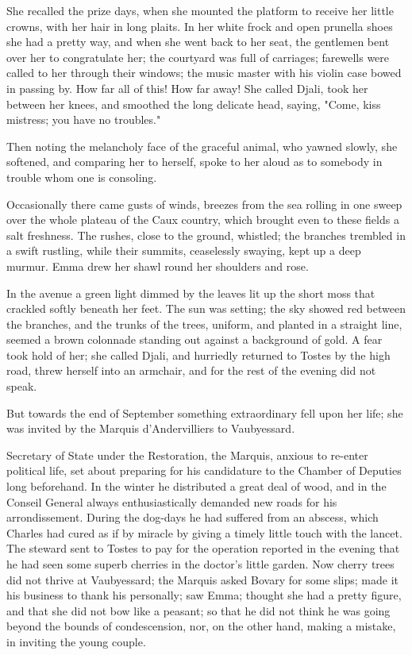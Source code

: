 \documentclass[11pt,twocolumn]{ltugboat}
\begin{document}
She recalled the prize days, when she mounted the platform to receive
her little crowns, with her hair in long plaits. In her white frock and
open prunella shoes she had a pretty way, and when she went back to her
seat, the gentlemen bent over her to congratulate her; the courtyard was
full of carriages; farewells were called to her through their windows;
the music master with his violin case bowed in passing by. How far all
of this! How far away! She called Djali, took her between her knees, and
smoothed the long delicate head, saying, "Come, kiss mistress; you have
no troubles."

Then noting the melancholy face of the graceful animal, who yawned
slowly, she softened, and comparing her to herself, spoke to her aloud
as to somebody in trouble whom one is consoling.

Occasionally there came gusts of winds, breezes from the sea rolling in
one sweep over the whole plateau of the Caux country, which brought
even to these fields a salt freshness. The rushes, close to the ground,
whistled; the branches trembled in a swift rustling, while their
summits, ceaselessly swaying, kept up a deep murmur. Emma drew her shawl
round her shoulders and rose.

In the avenue a green light dimmed by the leaves lit up the short moss
that crackled softly beneath her feet. The sun was setting; the sky
showed red between the branches, and the trunks of the trees, uniform,
and planted in a straight line, seemed a brown colonnade standing out
against a background of gold. A fear took hold of her; she called Djali,
and hurriedly returned to Tostes by the high road, threw herself into an
armchair, and for the rest of the evening did not speak.

But towards the end of September something extraordinary fell upon her
life; she was invited by the Marquis d'Andervilliers to Vaubyessard.

Secretary of State under the Restoration, the Marquis, anxious to
re-enter political life, set about preparing for his candidature to
the Chamber of Deputies long beforehand. In the winter he distributed a
great deal of wood, and in the Conseil General always enthusiastically
demanded new roads for his arrondissement. During the dog-days he had
suffered from an abscess, which Charles had cured as if by miracle by
giving a timely little touch with the lancet. The steward sent to Tostes
to pay for the operation reported in the evening that he had seen some
superb cherries in the doctor's little garden. Now cherry trees did not
thrive at Vaubyessard; the Marquis asked Bovary for some slips; made it
his business to thank his personally; saw Emma; thought she had a pretty
figure, and that she did not bow like a peasant; so that he did not
think he was going beyond the bounds of condescension, nor, on the other
hand, making a mistake, in inviting the young couple.
\end{document}
